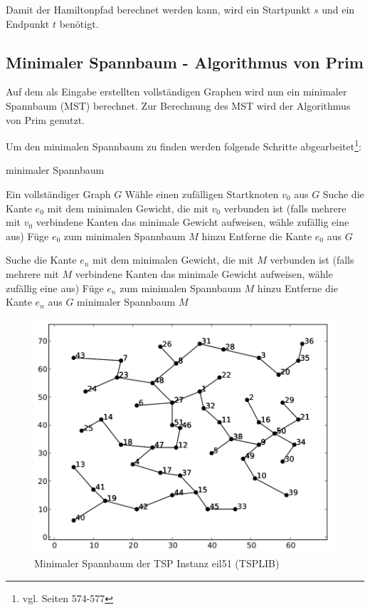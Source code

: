 \documentclass[11pt,a4paper]{article}
\begin{document}
Damit der Hamiltonpfad berechnet werden kann, wird ein Startpunkt $s$ und ein Endpunkt $t$ benötigt.

\subsection{Minimaler Spannbaum - Algorithmus von Prim}
Auf dem als Eingabe erstellten vollständigen Graphen wird nun ein minimaler Spannbaum (MST) berechnet. Zur Berechnung des MST wird der Algorithmus von Prim genutzt.

Um den minimalen Spannbaum zu finden werden folgende Schritte abgearbeitet\footnote{vgl. \cite{cormen07} Seiten 574-577}:

\begin{algorithm}[H]
    \renewcommand{\algorithmicrequire}{\textbf{Eingabe:}}
    \renewcommand{\algorithmicensure}{\textbf{Ausgabe:}}
    \caption{minimaler Spannbaum}

    \begin{algorithmic}[1]
    \REQUIRE Ein vollständiger Graph $G$
        \STATE Wähle einen zufälligen Startknoten $v_0$ aus $G$
        \STATE Suche die Kante $e_0$ mit dem minimalen Gewicht, die mit $v_0$ verbunden ist (falls mehrere mit $v_0$ verbindene Kanten das minimale Gewicht aufweisen, wähle zufällig eine aus)
        \STATE Füge $e_0$ zum minimalen Spannbaum $M$ hinzu
        \STATE Entferne die Kante $e_0$ aus $G$

            \STATE Suche die Kante $e_n$ mit dem minimalen Gewicht, die mit $M$ verbunden ist (falls mehrere mit $M$ verbindene Kanten das minimale Gewicht aufweisen, wähle zufällig eine aus)
            \STATE Füge $e_n$ zum minimalen Spannbaum $M$ hinzu
            \STATE Entferne die Kante $e_n$ aus $G$
        \ENDWHILE
    \ENSURE minimaler Spannbaum $M$
    \end{algorithmic}
\end{algorithm}

\begin{figure}[H]
        \centering
        \includegraphics[width=14cm]{gfx/eil51_mst}
        \caption{Minimaler Spannbaum der TSP Instanz eil51 (TSPLIB)}
        \label{img:eil51_mst}
\end{figure}
\end{document}
